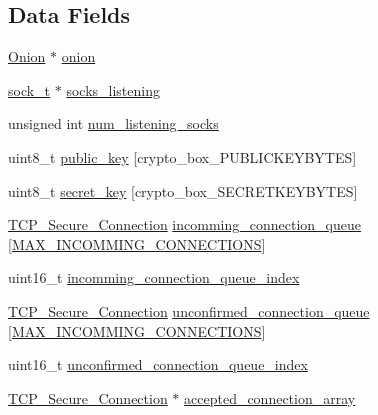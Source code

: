 \subsection*{Data Fields}
\begin{DoxyCompactItemize}
\item 
\hyperlink{struct_onion}{Onion} $\ast$ \hyperlink{struct_t_c_p___server_a66fb4bf67c711a5ed3e7bbecec7fde30}{onion}
\item 
\hyperlink{network_8h_ae5faf8a8d23da59c3e3025a62039d8c1}{sock\+\_\+t} $\ast$ \hyperlink{struct_t_c_p___server_a120d7e1abddb3a838bc0d0442f4ad8e6}{socks\+\_\+listening}
\item 
unsigned int \hyperlink{struct_t_c_p___server_a5efc50bc21a4b488b17bb593b2758718}{num\+\_\+listening\+\_\+socks}
\item 
uint8\+\_\+t \hyperlink{struct_t_c_p___server_aaa806bb1136fb3d4b5d8d8970b596ff7}{public\+\_\+key} \mbox{[}crypto\+\_\+box\+\_\+\+P\+U\+B\+L\+I\+C\+K\+E\+Y\+B\+Y\+T\+E\+S\mbox{]}
\item 
uint8\+\_\+t \hyperlink{struct_t_c_p___server_a41928223d6ad8bd41837f371deef62ae}{secret\+\_\+key} \mbox{[}crypto\+\_\+box\+\_\+\+S\+E\+C\+R\+E\+T\+K\+E\+Y\+B\+Y\+T\+E\+S\mbox{]}
\item 
\hyperlink{struct_t_c_p___secure___connection}{T\+C\+P\+\_\+\+Secure\+\_\+\+Connection} \hyperlink{struct_t_c_p___server_aee7190e93d63765a9a2642895d6ec8b0}{incomming\+\_\+connection\+\_\+queue} \mbox{[}\hyperlink{_t_c_p__server_8h_a2c62883bf7895f3582975a14ec316bef}{M\+A\+X\+\_\+\+I\+N\+C\+O\+M\+M\+I\+N\+G\+\_\+\+C\+O\+N\+N\+E\+C\+T\+I\+O\+N\+S}\mbox{]}
\item 
uint16\+\_\+t \hyperlink{struct_t_c_p___server_a3365834b14a58220182399bdc98198f9}{incomming\+\_\+connection\+\_\+queue\+\_\+index}
\item 
\hyperlink{struct_t_c_p___secure___connection}{T\+C\+P\+\_\+\+Secure\+\_\+\+Connection} \hyperlink{struct_t_c_p___server_a8e84d42c724209bf3967de32506beeba}{unconfirmed\+\_\+connection\+\_\+queue} \mbox{[}\hyperlink{_t_c_p__server_8h_a2c62883bf7895f3582975a14ec316bef}{M\+A\+X\+\_\+\+I\+N\+C\+O\+M\+M\+I\+N\+G\+\_\+\+C\+O\+N\+N\+E\+C\+T\+I\+O\+N\+S}\mbox{]}
\item 
uint16\+\_\+t \hyperlink{struct_t_c_p___server_a86567f857493f585eb843963350a9f0b}{unconfirmed\+\_\+connection\+\_\+queue\+\_\+index}
\item 
\hyperlink{struct_t_c_p___secure___connection}{T\+C\+P\+\_\+\+Secure\+\_\+\+Connection} $\ast$ \hyperlink{struct_t_c_p___server_aaec24f8b80a7853d1b7da87e903c44ee}{accepted\+\_\+connection\+\_\+array}

\end{DoxyCompactItemize}
